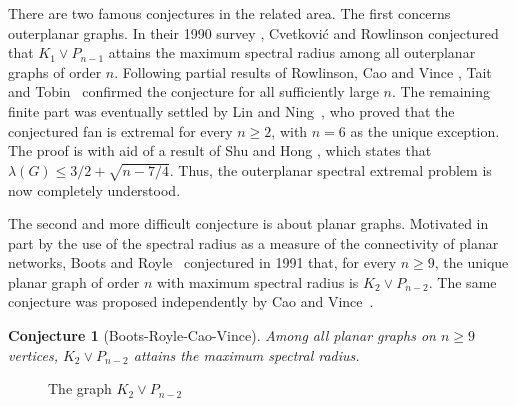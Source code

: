 \documentclass[11pt]{article}
\theoremstyle{plain}
\newtheorem{conjecture}{Conjecture}[section]
\theoremstyle{definition}
\numberwithin{equation}{section}
\begin{document}
There are two famous conjectures in the related area. The first concerns outerplanar graphs. 
In their 1990 survey \cite{CvetkovicRowlinson1990}, Cvetkovi\'c and Rowlinson conjectured
that $K_1\vee P_{n-1}$ attains the maximum spectral radius among all outerplanar graphs of order $n$. Following partial results of Rowlinson,
Cao and Vince \cite{CaoVince1993}, Tait and Tobin~\cite{TaitTobin2017} confirmed the
conjecture for all sufficiently large $n$. The remaining finite part was
eventually settled by Lin and Ning~\cite{LinNing2021}, who proved that the
conjectured fan is extremal for every $n\geq 2$, with $n=6$ as the unique
exception. The proof is with aid of a result of Shu and Hong \cite{ShuHong2000}, which states that $\lambda(G)\leq 3/2 + \sqrt{n - 7/4}$.
Thus, the outerplanar spectral extremal problem is now completely
understood.

The second and more difficult conjecture is about planar graphs. Motivated in part by the use 
of the spectral radius as a measure of the connectivity of planar networks, Boots and Royle~\cite{BootsRoyle1991}
conjectured in 1991 that, for every $n\geq 9$, the unique planar graph of order
$n$ with maximum spectral radius is $K_2\vee P_{n-2}$. The same conjecture was proposed independently 
by Cao and Vince~\cite{CaoVince1993}. 

\begin{conjecture}[Boots-Royle-Cao-Vince]
Among all planar graphs on $n\geq 9$ vertices, $K_2\vee P_{n-2}$ attains the maximum spectral radius.   
\end{conjecture}

\begin{figure}[htbp]
\centering
{}
\caption{The graph $K_2\vee P_{n-2}$}
\label{fig:candidate}
\end{figure}
\end{document}
